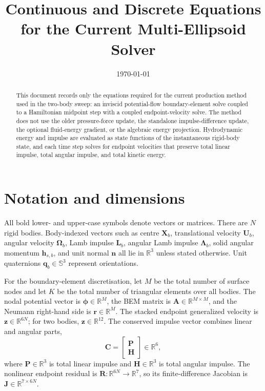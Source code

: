 \documentclass[11pt,a4paper]{article}
\title{Continuous and Discrete Equations for the Current Multi-Ellipsoid Solver}
\author{}
\date{\today}
\newcommand{\R}{\mathbb{R}}
\newcommand{\bn}{\bm{n}}
\newcommand{\bX}{\bm{X}}
\newcommand{\bU}{\bm{U}}
\newcommand{\bOmega}{\bm{\Omega}}
\newcommand{\bL}{\bm{L}}
\newcommand{\bLam}{\bm{\Lambda}}
\newcommand{\bh}{\bm{h}}
\newcommand{\bP}{\bm{P}}
\newcommand{\bH}{\bm{H}}
\newcommand{\bC}{\bm{C}}
\newcommand{\bR}{\bm{R}}
\newcommand{\bz}{\bm{z}}
\newcommand{\bA}{\bm{A}}
\newcommand{\bJ}{\bm{J}}
\newcommand{\quat}[1]{\mathbf{#1}}
\newcommand{\phiv}{\bm{\phi}}
\begin{document}
\setcounter{page}{1}
\setcounter{section}{0}
\maketitle

\begin{abstract}
This document records only the equations required for the current production
method used in the two-body sweep: an inviscid potential-flow boundary-element
solve coupled to a Hamiltonian midpoint step with a coupled endpoint-velocity
solve.  The method does not use the older pressure-force update, the standalone
impulse-difference update, the optional fluid-energy gradient, or the algebraic
energy projection.  Hydrodynamic energy and impulse are evaluated as state
functions of the instantaneous rigid-body state, and each time step solves for
endpoint velocities that preserve total linear impulse, total angular impulse,
and total kinetic energy.
\end{abstract}

\section{Notation and dimensions}

All bold lower- and upper-case symbols denote vectors or matrices.  There are
$N$ rigid bodies.  Body-indexed vectors such as centre $\bX_b$, translational
velocity $\bU_b$, angular velocity $\bOmega_b$, Lamb impulse $\bL_b$, angular
Lamb impulse $\bLam_b$, solid angular momentum $\bh_{s,b}$, and unit normal
$\bn$ all lie in $\R^3$ unless stated otherwise.  Unit quaternions
$\quat{q}_b\in\mathbb{S}^3$ represent orientations.

For the boundary-element discretisation, let $M$ be the total number of surface
nodes and let $K$ be the total number of triangular elements over all bodies.
The nodal potential vector is $\phiv\in\R^M$, the BEM matrix is
$\bA\in\R^{M\times M}$, and the Neumann right-hand side is $\bm{r}\in\R^M$.
The stacked endpoint generalized velocity is $\bz\in\R^{6N}$; for two bodies,
$\bz\in\R^{12}$.  The conserved impulse vector combines linear and angular
parts,
\begin{equation}
  \bC =
  \begin{bmatrix}
    \bP\\
    \bH
  \end{bmatrix}
  \in\R^6,
\end{equation}
where $\bP\in\R^3$ is total linear impulse and $\bH\in\R^3$ is total angular
impulse.  The nonlinear endpoint residual is $\bR:\R^{6N}\to\R^7$, so its
finite-difference Jacobian is $\bJ\in\R^{7\times 6N}$.
\end{document}
